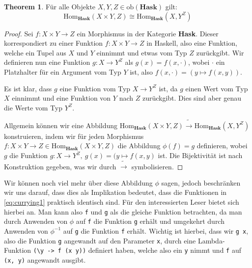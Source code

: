 \documentclass{hhuarticle}
\theoremstyle{definition}
\theoremstyle{theorem}
\newtheorem{theorem}{Theorem}[section]
\begin{document}
  \begin{theorem}
    Für alle Objekte $X, Y, Z \in \text{ob}(\textbf{Hask})$ gilt:
    \begin{equation}
      \text{Hom}_\textbf{Hask}(X \times Y, Z) \cong \text{Hom}_\textbf{Hask}(X, Y^Z)
    \end{equation}
  \end{theorem}

  \begin{proof}
    Sei $f: X \times Y \to Z$ ein Morphismus in der Kategorie \textbf{Hask}.
    Dieser korrespondiert zu einer Funktion $f: X \times Y \to Z$ in Haskell,
    also eine Funktion, welche ein Tupel aus $X$ und $Y$ einnimmt und etwas
    vom Typ $Z$ zurückgibt. Wir definieren nun eine Funktion
    $g: X \to Y^Z$ als $g(x) = f(x, \cdot)$, wobei $\cdot$ ein Platzhalter
    für ein Argument vom Typ $Y$ ist, also
    $f(x, \cdot) = (y \mapsto f(x, y))$.

    Es ist klar, dass $g$ eine Funktion vom Typ $X \to Y^Z$ ist, da
    $g$ einen Wert vom Typ $X$ einnimmt und eine Funktion von $Y$ nach $Z$
    zurückgibt. Dies sind aber genau die Werte vom Typ $Y^Z$.

    Allgemein können wir eine Abbildung
    $\text{Hom}_\textbf{Hask}(X \times Y, Z) \tilde\to \text{Hom}_\textbf{Hask}(X, Y^Z)$
    konstruieren, indem wir für jeden Morphismus $f: X \times Y \to Z \in \text{Hom}_\textbf{Hask}(X \times Y, Z)$
    die Abbildung $\phi(f) = g$ definieren, wobei $g$ die Funktion
    $g: X \to Y^Z, \> g(x) = (y \mapsto f(x,y)$ ist. Die Bijektivität
    ist nach Konstruktion gegeben, was wir durch $\tilde \to$ symbolisieren.
  \end{proof}

  Wir können noch viel mehr über diese Abbildung $\phi$ sagen, jedoch
  beschränken wir uns darauf, dass dies als Implikation bedeutet, dass
  die Funktionen in \cref{eq:currying1} praktisch identisch sind.
  Für den interessierten Leser bietet sich hierbei \cite[S. 53, Proposition 3.3.2]{CATEGORIES_TYPES_AND_STRUCTURES} an.
  Man kann also \verb|f| und \verb|g| als die gleiche Funktion
  betrachten, da man durch Anwenden von $\phi$ auf \verb|f| die Funktion
  \verb|g| erhält und umgekehrt durch Anwenden von $\phi^{-1}$ auf \verb|g|
  die Funktion \verb|f| erhält. Wichtig ist hierbei,
  dass wir \verb|g x|, also die Funktion \verb|g| angewandt auf
  den Parameter \verb|x|, durch eine Lambda-Funktion
  \verb|(\y -> f (x y))| definiert haben, welche also ein \verb|y| nimmt
  und \verb|f| auf \verb|(x, y)| angewandt ausgibt.
\end{document}

